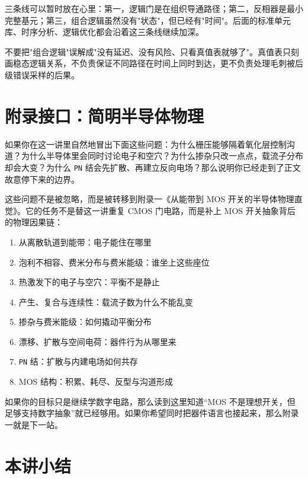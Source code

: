 \documentclass[11pt,a4paper]{article}
\begin{document}
\begin{tipbox}
三条线可以暂时放在心里：第一，逻辑门是在组织导通路径；第二，反相器是最小完整基元；第三，组合逻辑虽然没有"状态"，但已经有"时间"。后面的标准单元库、时序分析、逻辑优化都会沿着这三条线继续加深。
\end{tipbox}

\begin{warnbox}
不要把"组合逻辑"误解成"没有延迟、没有风险、只看真值表就够了"。真值表只刻画稳态逻辑关系，不负责保证不同路径在时间上同时到达，更不负责处理毛刺被后级错误采样的后果。
\end{warnbox}

\section{附录接口：简明半导体物理}

如果你在这一讲里自然地冒出下面这些问题：为什么栅压能够隔着氧化层控制沟道？为什么半导体里会同时讨论电子和空穴？为什么掺杂只改一点点，载流子分布却会大变？为什么 \texttt{PN} 结会先扩散、再建立反向电场？那么说明你已经走到了正文故意停下来的边界。

这些问题不是被忽略，而是被转移到附录一《从能带到 MOS 开关的半导体物理直觉》。它的任务不是替这一讲重复 CMOS 门电路，而是补上 MOS 开关抽象背后的物理因果链：

\begin{enumerate}
  \item 从离散轨道到能带：电子能住在哪里
  \item 泡利不相容、费米分布与费米能级：谁坐上这些座位
  \item 热激发下的电子与空穴：平衡不是静止
  \item 产生、复合与连续性：载流子数为什么不能乱变
  \item 掺杂与费米能级：如何撬动平衡分布
  \item 漂移、扩散与空间电荷：器件行为从哪里来
  \item \texttt{PN} 结：扩散与内建电场如何共存
  \item MOS 结构：积累、耗尽、反型与沟道形成
\end{enumerate}

如果你的目标只是继续学数字电路，那么读到这里知道“MOS 不是理想开关，但足够支持数字抽象”就已经够用。如果你希望同时把器件语言也接起来，那么附录一就是下一站。

\section{本讲小结}
\end{document}
